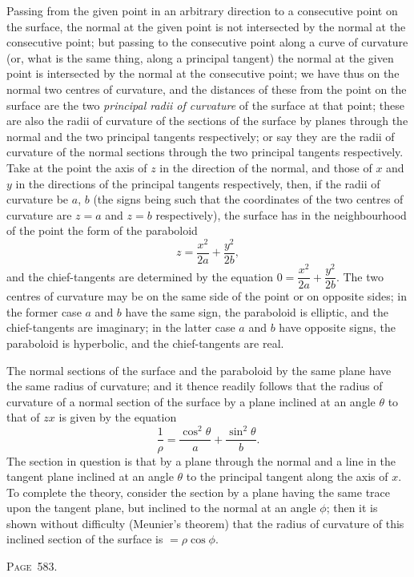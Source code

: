 \documentclass[11pt,a4paper]{book}
\begin{document}
Passing from the given point in an arbitrary direction to a consecutive point on the surface, the normal at the given point is not intersected by the normal at the consecutive point; but passing to the consecutive point along a curve of curvature (or, what is the same thing, along a principal tangent) the normal at the given point is intersected by the normal at the consecutive point; we have thus on the normal two centres of curvature, and the distances of these from the point on the surface are the two \textit{principal radii of curvature} of the surface at that point; these are also the radii of curvature of the sections of the surface by planes through the normal and the two principal tangents respectively; or say they are the radii of curvature of the normal sections through the two principal tangents respectively. Take at the point the axis of $z$ in the direction of the normal, and those of $x$ and $y$ in the directions of the principal tangents respectively, then, if the radii of curvature be $a$, $b$ (the signs being such that the coordinates of the two centres of curvature are $z=a$ and $z=b$ respectively), the surface has in the neighbourhood of the point the form of the paraboloid
\[
z=\frac{x^2}{2a}+\frac{y^2}{2b},
\]
and the chief-tangents are determined by the equation $0=\dfrac{x^2}{2a}+\dfrac{y^2}{2b}$. The two centres of curvature may be on the same side of the point or on opposite sides; in the former case $a$ and $b$ have the same sign, the paraboloid is elliptic, and the chief-tangents are imaginary; in the latter case $a$ and $b$ have opposite signs, the paraboloid is hyperbolic, and the chief-tangents are real.

The normal sections of the surface and the paraboloid by the same plane have the same radius of curvature; and it thence readily follows that the radius of curvature of a normal section of the surface by a plane inclined at an angle $\theta$ to that of $zx$ is given by the equation
\[
\frac{1}{\rho}=\frac{\cos^2\theta}{a}+\frac{\sin^2\theta}{b}.
\]
The section in question is that by a plane through the normal and a line in the tangent plane inclined at an angle $\theta$ to the principal tangent along the axis of $x$. To complete the theory, consider the section by a plane having the same trace upon the tangent plane, but inclined to the normal at an angle $\phi$; then it is shown without difficulty (Meunier's theorem) that the radius of curvature of this inclined section of the surface is $=\rho\cos\phi$.

\newpage
\noindent\textsc{Page~583.}
\end{document}
